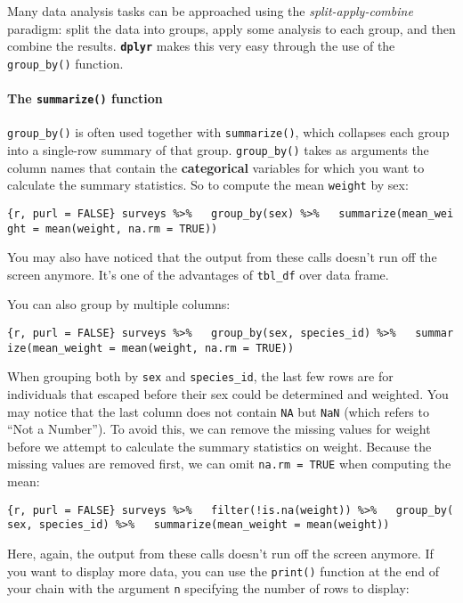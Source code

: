 \documentclass[]{article}
\let\oldparagraph\paragraph
\renewcommand{\paragraph}[1]{\oldparagraph{#1}\mbox{}}
\begin{document}
Many data analysis tasks can be approached using the
\emph{split-apply-combine} paradigm: split the data into groups, apply
some analysis to each group, and then combine the results.
\textbf{\texttt{dplyr}} makes this very easy through the use of the
\texttt{group\_by()} function.

\paragraph{\texorpdfstring{The \texttt{summarize()}
function}{The summarize() function}}\label{the-summarize-function}

\texttt{group\_by()} is often used together with \texttt{summarize()},
which collapses each group into a single-row summary of that group.
\texttt{group\_by()} takes as arguments the column names that contain
the \textbf{categorical} variables for which you want to calculate the
summary statistics. So to compute the mean \texttt{weight} by sex:

\texttt{\{r,\ purl\ =\ FALSE\}\ surveys\ \%\textgreater{}\%\ \ \ group\_by(sex)\ \%\textgreater{}\%\ \ \ summarize(mean\_weight\ =\ mean(weight,\ na.rm\ =\ TRUE))}

You may also have noticed that the output from these calls doesn't run
off the screen anymore. It's one of the advantages of \texttt{tbl\_df}
over data frame.

You can also group by multiple columns:

\texttt{\{r,\ purl\ =\ FALSE\}\ surveys\ \%\textgreater{}\%\ \ \ group\_by(sex,\ species\_id)\ \%\textgreater{}\%\ \ \ summarize(mean\_weight\ =\ mean(weight,\ na.rm\ =\ TRUE))}

When grouping both by \texttt{sex} and \texttt{species\_id}, the last
few rows are for individuals that escaped before their sex could be
determined and weighted. You may notice that the last column does not
contain \texttt{NA} but \texttt{NaN} (which refers to ``Not a Number'').
To avoid this, we can remove the missing values for weight before we
attempt to calculate the summary statistics on weight. Because the
missing values are removed first, we can omit \texttt{na.rm\ =\ TRUE}
when computing the mean:

\texttt{\{r,\ purl\ =\ FALSE\}\ surveys\ \%\textgreater{}\%\ \ \ filter(!is.na(weight))\ \%\textgreater{}\%\ \ \ group\_by(sex,\ species\_id)\ \%\textgreater{}\%\ \ \ summarize(mean\_weight\ =\ mean(weight))}

Here, again, the output from these calls doesn't run off the screen
anymore. If you want to display more data, you can use the
\texttt{print()} function at the end of your chain with the argument
\texttt{n} specifying the number of rows to display:
\end{document}
